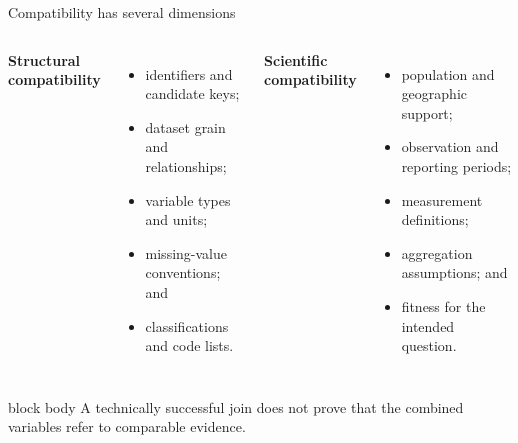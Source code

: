 \documentclass[10pt,aspectratio=169]{beamer}
\begin{document}
\begin{frame}{Compatibility has several dimensions}

\small

\begin{columns}[T]


\textbf{Structural compatibility}

\begin{itemize}
  \item identifiers and candidate keys;
  \item dataset grain and relationships;
  \item variable types and units;
  \item missing-value conventions; and
  \item classifications and code lists.
\end{itemize}


\textbf{Scientific compatibility}

\begin{itemize}
  \item population and geographic support;
  \item observation and reporting periods;
  \item measurement definitions;
  \item aggregation assumptions; and
  \item fitness for the intended question.
\end{itemize}

\end{columns}

\vspace{0.35cm}

\begin{beamercolorbox}[rounded=true,sep=8pt]{block body}
A technically successful join does not prove that the combined variables refer to comparable evidence.
\end{beamercolorbox}

\end{frame}
\end{document}
